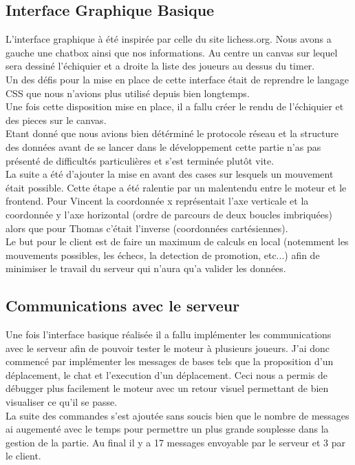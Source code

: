 \documentclass{article}
\begin{document}
\subsection{Interface Graphique Basique}
L'interface graphique à été inspirée par celle du site lichess.org. Nous avons a gauche une chatbox ainsi que nos informations. Au centre un canvas sur lequel sera dessiné l'échiquier et a droite la liste des joueurs au dessus du timer.\\
Un des défis pour la mise en place de cette interface était de reprendre le langage CSS que nous n'avions plus utilisé depuis bien longtemps.\\
Une fois cette disposition mise en place, il a fallu créer le rendu de l'échiquier et des pieces sur le canvas.\\
Etant donné que nous avions bien détérminé le protocole réseau et la structure des données avant de se lancer dans le développement cette partie n'as pas présenté de difficultés particulières et s'est terminée plutôt vite.\\
La suite a été d'ajouter la mise en avant des cases sur lesquels un mouvement était possible. Cette étape a été ralentie par un malentendu entre le moteur et le frontend. Pour Vincent la coordonnée x représentait l'axe verticale et la coordonnée y l'axe horizontal (ordre de parcours de deux boucles imbriquées) alors que pour Thomas c'était l'inverse (coordonnées cartésiennes).\\
Le but pour le client est de faire un maximum de calculs en local (notemment les mouvements possibles, les échecs, la detection de promotion, etc...) afin de minimiser le travail du serveur qui n'aura qu'a valider les données.

\subsection{Communications avec le serveur}
Une fois l'interface basique réalisée il a fallu implémenter les communications avec le serveur afin de pouvoir tester le moteur à plusieurs joueurs. J'ai donc commencé par implémenter les messages de bases tels que la proposition d'un déplacement, le chat et l'execution d'un déplacement. Ceci nous a permis de débugger plus facilement le moteur avec un retour visuel permettant de bien visualiser ce qu'il se passe.\\
La suite des commandes s'est ajoutée sans soucis bien que le nombre de messages ai augementé avec le temps pour permettre un plus grande souplesse dans la gestion de la partie. Au final il y a 17 messages envoyable par le serveur et 3 par le client.
\end{document}
